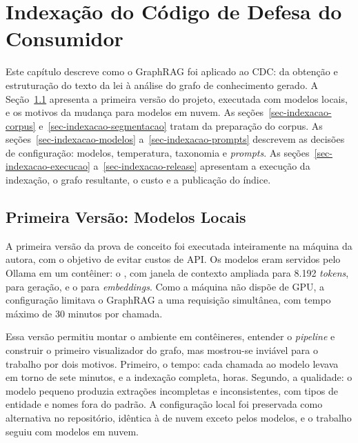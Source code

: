 \chapter{Indexação do Código de Defesa do Consumidor}
\label{sec-indexacao}

Este capítulo descreve como o GraphRAG foi aplicado ao CDC: da obtenção e estruturação do texto da lei à análise do grafo de conhecimento gerado. A Seção~\ref{sec-indexacao-inicial} apresenta a primeira versão do projeto, executada com modelos locais, e os motivos da mudança para modelos em nuvem. As seções~\ref{sec-indexacao-corpus} e~\ref{sec-indexacao-segmentacao} tratam da preparação do corpus. As seções~\ref{sec-indexacao-modelos} a~\ref{sec-indexacao-prompts} descrevem as decisões de configuração: modelos, temperatura, taxonomia e \textit{prompts}. As seções~\ref{sec-indexacao-execucao} a~\ref{sec-indexacao-release} apresentam a execução da indexação, o grafo resultante, o custo e a publicação do índice.

\section{Primeira Versão: Modelos Locais}
\label{sec-indexacao-inicial}

A primeira versão da prova de conceito foi executada inteiramente na máquina da autora, com o objetivo de evitar custos de API. Os modelos eram servidos pelo Ollama \cite{ollama} em um contêiner: o , com janela de contexto ampliada para 8.192 \textit{tokens}, para geração, e o  para \textit{embeddings}. Como a máquina não dispõe de GPU, a configuração limitava o GraphRAG a uma requisição simultânea, com tempo máximo de 30 minutos por chamada.

Essa versão permitiu montar o ambiente em contêineres, entender o \textit{pipeline} e construir o primeiro visualizador do grafo, mas mostrou-se inviável para o trabalho por dois motivos. Primeiro, o tempo: cada chamada ao modelo levava em torno de sete minutos, e a indexação completa, horas. Segundo, a qualidade: o modelo pequeno produzia extrações incompletas e inconsistentes, com tipos de entidade e nomes fora do padrão. A configuração local foi preservada como alternativa no repositório, idêntica à de nuvem exceto pelos modelos, e o trabalho seguiu com modelos em nuvem.

